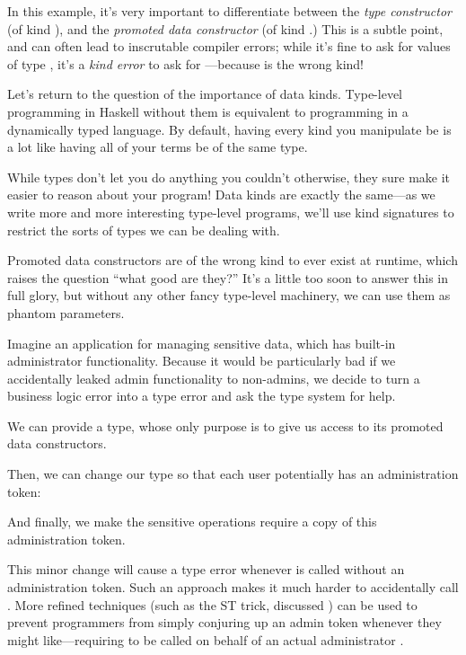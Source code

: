 \documentclass[book.tex]{subfiles}
\begin{document}

In this example, it's very important to differentiate between the \emph{type
constructor}  (of kind ), and the \emph{promoted data
constructor}  (of kind .) This is a subtle point, and can
often lead to inscrutable compiler errors; while it's fine to ask for values of
type , it's a \emph{kind error} to ask for ---because  is the wrong kind!

Let's return to the question of the importance of data kinds. Type-level
programming in Haskell without them is equivalent to programming in a
dynamically typed language. By default, having every kind you manipulate be
 is a lot like having all of your terms be of the same type.

While types don't let you do anything you couldn't otherwise, they sure make it
easier to reason about your program! Data kinds are exactly the same---as we
write more and more interesting type-level programs, we'll use kind signatures
to restrict the sorts of types we can be dealing with.

Promoted data constructors are of the wrong kind to ever exist at runtime, which
raises the question ``what good are they?'' It's a little too soon to answer
this in full glory, but without any other fancy type-level machinery, we can use
them as \gls{phantom} parameters.

Imagine an application for managing sensitive data, which has built-in
administrator functionality. Because it would be particularly bad if we
accidentally leaked admin functionality to non-admins, we decide to turn a
business logic error into a type error and ask the type system for help.

We can provide a  type, whose only purpose is to give us access to
its promoted data constructors.


Then, we can change our  type so that each user potentially has an
administration token:


And finally, we make the sensitive operations require a copy of this
administration token.


This minor change will cause a type error whenever  is
called without an administration token. Such an approach makes it much harder to
accidentally call . More refined techniques (such as the
\gls{ST trick}, discussed ) can be used to prevent
programmers from simply conjuring up an admin token whenever they might
like---requiring  to be called on behalf of an
actual administrator .
\end{document}

